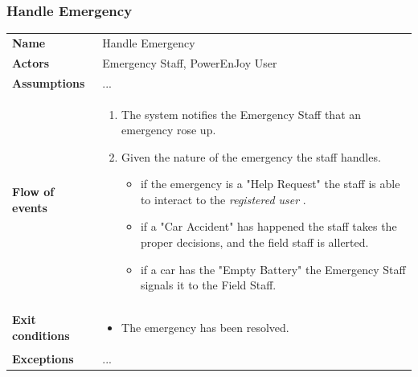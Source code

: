 \documentclass[english]{article}
\newcommand{\registereduser}{\textit {registered user }}
\begin{document}
\subsubsection{Handle Emergency}
	\begin{center}
	\begin{tabular}{l||p{10cm}}
	\textbf{Name} 
		& Handle Emergency\\ [8px]
	\textbf{Actors} 
		& Emergency Staff, PowerEnJoy User\\ [8px]
	\textbf{Assumptions} 
		&...\\[8px]
	\textbf{Flow of events}
		& \begin{enumerate}
			\item The system notifies the Emergency Staff that an emergency rose up.
			\item Given the nature of the emergency the staff handles.
				\begin{itemize}
					\item if the emergency is a "Help Request" the staff is able to interact to the \registereduser.
					\item if a "Car Accident" has happened the staff takes the proper decisions, and the field staff is allerted.
					\item if a car has the "Empty Battery" the Emergency Staff signals it to the Field Staff.
			\end{itemize} 
		\end{enumerate}\\ 
	\textbf{Exit conditions}
		&\begin{itemize}
			\item The emergency has been resolved.
		\end{itemize}\\
	\textbf{Exceptions}
		&...\\[8px]
	\end{tabular}
	\end{center}
\end{document}
